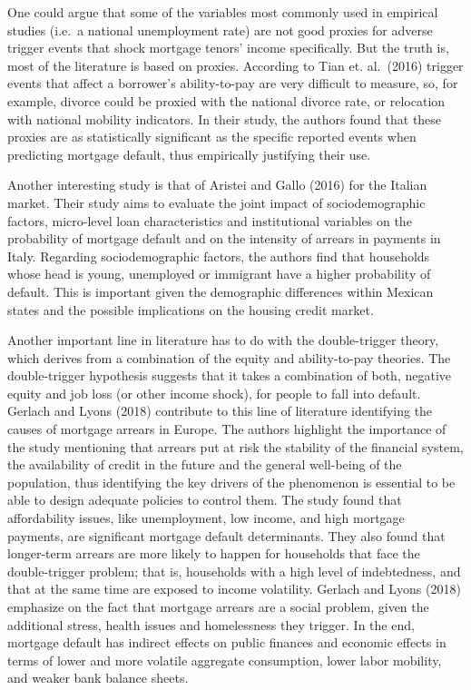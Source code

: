 \documentclass[
]{article}
\begin{document}
One could argue that some of the variables most commonly used in
empirical studies (i.e.~a national unemployment rate) are not good
proxies for adverse trigger events that shock mortgage tenors' income
specifically. But the truth is, most of the literature is based on
proxies. According to Tian et. al.~(2016) trigger events that affect a
borrower's ability-to-pay are very difficult to measure, so, for
example, divorce could be proxied with the national divorce rate, or
relocation with national mobility indicators. In their study, the
authors found that these proxies are as statistically significant as the
specific reported events when predicting mortgage default, thus
empirically justifying their use.

Another interesting study is that of Aristei and Gallo (2016) for the
Italian market. Their study aims to evaluate the joint impact of
sociodemographic factors, micro-level loan characteristics and
institutional variables on the probability of mortgage default and on
the intensity of arrears in payments in Italy. Regarding
sociodemographic factors, the authors find that households whose head is
young, unemployed or immigrant have a higher probability of default.
This is important given the demographic differences within Mexican
states and the possible implications on the housing credit market.

Another important line in literature has to do with the double-trigger
theory, which derives from a combination of the equity and
ability-to-pay theories. The double-trigger hypothesis suggests that it
takes a combination of both, negative equity and job loss (or other
income shock), for people to fall into default. Gerlach and Lyons (2018)
contribute to this line of literature identifying the causes of mortgage
arrears in Europe. The authors highlight the importance of the study
mentioning that arrears put at risk the stability of the financial
system, the availability of credit in the future and the general
well-being of the population, thus identifying the key drivers of the
phenomenon is essential to be able to design adequate policies to
control them. The study found that affordability issues, like
unemployment, low income, and high mortgage payments, are significant
mortgage default determinants. They also found that longer-term arrears
are more likely to happen for households that face the double-trigger
problem; that is, households with a high level of indebtedness, and that
at the same time are exposed to income volatility. Gerlach and Lyons
(2018) emphasize on the fact that mortgage arrears are a social problem,
given the additional stress, health issues and homelessness they
trigger. In the end, mortgage default has indirect effects on public
finances and economic effects in terms of lower and more volatile
aggregate consumption, lower labor mobility, and weaker bank balance
sheets.
\end{document}
